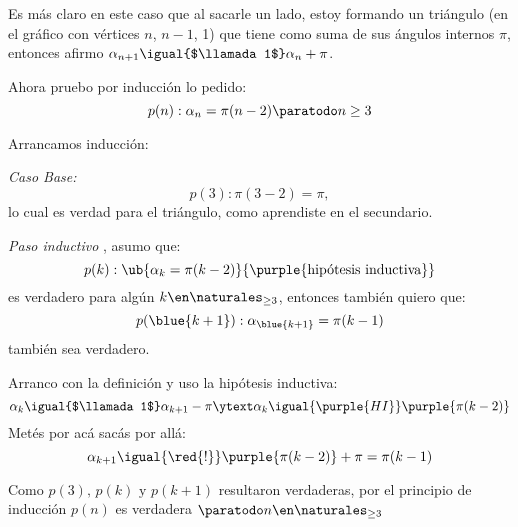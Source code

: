 \begin{enumerate}[label=\roman*)]
        Es más claro en este caso que al sacarle un lado, estoy formando un triángulo
        {\tiny(en el gráfico con vértices $n$, $n-1$, 1)}
        que tiene como suma de sus ángulos internos $\pi$, entonces afirmo
        $\alpha_{n+1} \igual{$\llamada1$} \alpha_n + \pi $.

        Ahora pruebo por inducción lo pedido:
        $$
          p(n): \alpha_n = \pi(n-2) \paratodo n \geq 3
        $$

        Arrancamos inducción:

        \textit{Caso Base: }
        $$
          p(3): \pi(3-2) = \pi,
        $$
        lo cual es verdad para el triángulo, como aprendiste en el secundario.

        \textit{Paso inductivo }, asumo que:
        $$
          p(k): \ub{\alpha_k = \pi(k-2)}{\text{\purple{hipótesis inductiva}}}
        $$
        es verdadero para algún $k \en \naturales_{\geq 3}$, entonces también quiero que:
        $$
          p(\blue{k+1}): \alpha_{\blue{k+1}} = \pi(k-1)
        $$
        también sea verdadero.

        Arranco con la definición y uso la hipótesis inductiva:
        $$
          \alpha_k \igual{$\llamada1$}  \alpha_{k+1} - \pi
          \ytext
          \alpha_k \igual{\purple{HI}}  \purple{\pi(k-2)}
        $$
        Metés por acá sacás por allá:
        $$
          \alpha_{k+1}
          \igual{\red{!}}
          \purple{\pi(k-2)} + \pi = \pi(k-1)
        $$

        Como $p(3),\, p(k) \text{ y } p(k+1)$ resultaron verdaderas, por el principio
        de inducción $p(n)$ es verdadera $\paratodo n \en \naturales_{\geq 3}$
\end{enumerate}

\begin{aportes}
  \item {}
  \item {}
\end{aportes}
